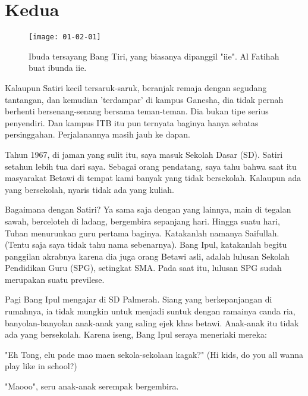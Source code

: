 
\chapter{Kedua}

\begin{figure}[htbp]
\centerline{\texttt{[image: 01-02-01]}}
\caption{Ibuda tersayang Bang Tiri, yang biasanya dipanggil "iie". Al Fatihah buat ibunda iie.}
\label{01-02-01}
\end{figure}
%

Kalaupun Satiri kecil tersaruk-saruk, 
beranjak remaja dengan segudang tantangan, dan kemudian 'terdampar' di kampus Ganesha, 
dia tidak pernah berhenti bersenang-senang bersama teman-teman. 
Dia bukan tipe serius penyendiri. 
Dan kampus ITB itu pun ternyata baginya hanya sebatas persinggahan. 
Perjalanannya masih jauh ke dapan.

Tahun 1967, di jaman yang sulit itu, saya masuk Sekolah Dasar (SD). 
Satiri setahun lebih tua dari saya. 
Sebagai orang pendatang, 
saya tahu bahwa saat itu masyarakat Betawi di tempat kami banyak yang tidak bersekolah. 
Kalaupun ada yang bersekolah, nyaris tidak ada yang kuliah.

Bagaimana dengan Satiri? Ya sama saja dengan yang lainnya, main di tegalan sawah, berceloteh di ladang, bergembira sepanjang hari. Hingga suatu hari, Tuhan menurunkan guru pertama baginya. Katakanlah namanya Saifullah. (Tentu saja saya tidak tahu nama sebenarnya). Bang Ipul, katakanlah begitu panggilan akrabnya karena dia juga orang Betawi asli, adalah lulusan Sekolah Pendidikan Guru (SPG), setingkat SMA. Pada saat itu, lulusan SPG sudah merupakan suatu previlese.

Pagi Bang Ipul mengajar di SD Palmerah. Siang yang berkepanjangan di rumahnya, ia tidak mungkin untuk menjadi suntuk dengan ramainya canda ria, banyolan-banyolan anak-anak yang saling ejek khas betawi. Anak-anak itu tidak ada yang bersekolah. Karena iseng, Bang Ipul seraya meneriaki mereka:

"Eh Tong, elu pade mao maen sekola-sekolaan kagak?" (Hi kids, do you all wanna play like in school?)

"Maooo", seru anak-anak serempak bergembira.

